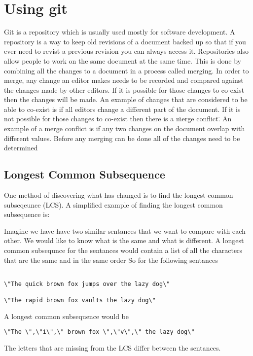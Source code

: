 
\chapter{Using git}
Git is a repository which is usually used mostly for software development.
A repository is a way to keep old revisions of a document backed up so that if you ever need to revist a previous revision you can always access it.
Repositories also allow people to work on the same document at the same time.
This is done by combining all the changes to a document in a process called merging. 
In order to merge, any change an editor makes needs to be recorded and compared against the changes made by other editors.
If it is possible for those changes to co-exist then the changes will be made.
An example of changes that are considered to be able to co-exist is if all editors change a different part of the document.
If it is not possible for those changes to co-exist then there is a \"merge conflict\".
An example of a merge conflict is if any two changes on the document overlap with different values.
Before any merging can be done all of the changes need to be determined 

\section{Longest Common Subsequence}
One method of discovering what has changed is to find the longest common subseqeunce (LCS).
A simplified example of finding the longest common subsequence is:

Imagine we have have two similar sentances that we want to compare with each other.  
We would like to know what is the same and what is different.
A longest common subsequnce for the sentances would contain a list of all the characters that are the same and in the same order
So for the following sentances

\begin{verbatim}

\"The quick brown fox jumps over the lazy dog\"

\"The rapid brown fox vaults the lazy dog\"

\end{verbatim}
A longest common subsequence would be
\begin{verbatim}
\"The \",\"i\",\" brown fox \",\"v\",\" the lazy dog\"
\end{verbatim}
The letters that are missing from the LCS differ between the sentances.

